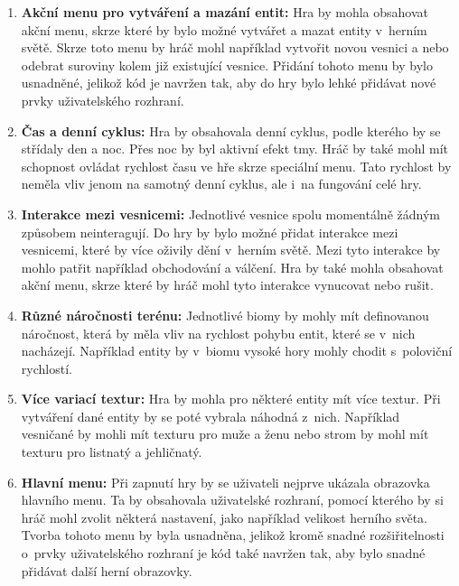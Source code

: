 \begin{enumerate}
    \item \textbf{Akční menu pro vytváření a mazání entit:} Hra by mohla obsahovat akční menu, skrze které by bylo možné vytvářet a mazat entity v~herním světě. Skrze toto menu by hráč mohl například vytvořit novou vesnici a nebo odebrat suroviny kolem již existující vesnice. Přidání tohoto menu by bylo usnadněné, jelikož kód je navržen tak, aby do hry bylo lehké přidávat nové prvky uživatelského rozhraní. 

    \item \textbf{Čas a denní cyklus:} Hra by obsahovala denní cyklus, podle kterého by se střídaly den a noc. Přes noc by byl aktivní efekt tmy. Hráč by také mohl mít schopnost ovládat rychlost času ve hře skrze speciální menu. Tato rychlost by neměla vliv jenom na samotný denní cyklus, ale i~na fungování celé hry.

    \item \textbf{Interakce mezi vesnicemi:} Jednotlivé vesnice spolu momentálně žádným způsobem neinteragují. Do hry by bylo možné přidat interakce mezi vesnicemi, které by více oživily dění v~herním světě. Mezi tyto interakce by mohlo patřit například obchodování a válčení. Hra by také mohla obsahovat akční menu, skrze které by hráč mohl tyto interakce vynucovat nebo rušit.

    \item \textbf{Různé náročnosti terénu:} Jednotlivé biomy by mohly mít definovanou náročnost, která by měla vliv na rychlost pohybu entit, které se v~nich nacházejí. Například entity by v~biomu vysoké hory mohly chodit s~poloviční rychlostí.

    \item \textbf{Více variací textur:} Hra by mohla pro některé entity mít více textur. Při vytváření dané entity by se poté vybrala náhodná z~nich. Například vesničané by mohli mít texturu pro muže a ženu nebo strom by mohl mít texturu pro listnatý a jehličnatý.

    \item \textbf{Hlavní menu:} Při zapnutí hry by se uživateli nejprve ukázala obrazovka hlavního menu. Ta by obsahovala uživatelské rozhraní, pomocí kterého by si hráč mohl zvolit některá nastavení, jako například velikost herního světa. Tvorba tohoto menu by byla usnadněna, jelikož kromě snadné rozšiřitelnosti o~prvky uživatelského rozhraní je kód také navržen tak, aby bylo snadné přidávat další herní obrazovky.
\end{enumerate}

